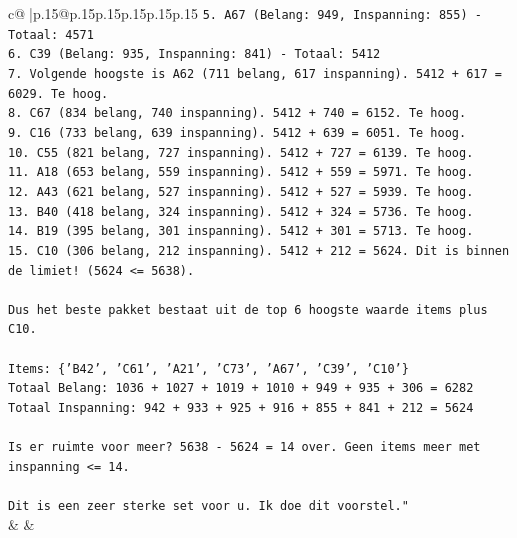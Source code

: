 \documentclass{article}
\begin{document}
{\begin{supertabular}{c@{$\;$}|p{.15\linewidth}@{}p{.15\linewidth}p{.15\linewidth}p{.15\linewidth}p{.15\linewidth}p{.15\linewidth}}
{{{\texttt{5. A67 (Belang: 949, Inspanning: 855) {-} Totaal: 4571} \\
\texttt{6. C39 (Belang: 935, Inspanning: 841) {-} Totaal: 5412} \\
\texttt{7. Volgende hoogste is A62 (711 belang, 617 inspanning). 5412 + 617 = 6029. Te hoog.} \\
\texttt{8. C67 (834 belang, 740 inspanning). 5412 + 740 = 6152. Te hoog.} \\
\texttt{9. C16 (733 belang, 639 inspanning). 5412 + 639 = 6051. Te hoog.} \\
\texttt{10. C55 (821 belang, 727 inspanning). 5412 + 727 = 6139. Te hoog.} \\
\texttt{11. A18 (653 belang, 559 inspanning). 5412 + 559 = 5971. Te hoog.} \\
\texttt{12. A43 (621 belang, 527 inspanning). 5412 + 527 = 5939. Te hoog.} \\
\texttt{13. B40 (418 belang, 324 inspanning). 5412 + 324 = 5736. Te hoog.} \\
\texttt{14. B19 (395 belang, 301 inspanning). 5412 + 301 = 5713. Te hoog.} \\
\texttt{15. C10 (306 belang, 212 inspanning). 5412 + 212 = 5624. Dit is binnen de limiet! (5624 <= 5638).} \\
\\ 
\texttt{Dus het beste pakket bestaat uit de top 6 hoogste waarde items plus C10.} \\
\\ 
\texttt{Items: \{'B42', 'C61', 'A21', 'C73', 'A67', 'C39', 'C10'\}} \\
\texttt{Totaal Belang: 1036 + 1027 + 1019 + 1010 + 949 + 935 + 306 = 6282} \\
\texttt{Totaal Inspanning: 942 + 933 + 925 + 916 + 855 + 841 + 212 = 5624} \\
\\ 
\texttt{Is er ruimte voor meer? 5638 {-} 5624 = 14 over. Geen items meer met inspanning <= 14.} \\
\\ 
\texttt{Dit is een zeer sterke set voor u. Ik doe dit voorstel."} \\
            }
        }
    }
    & & \\ \\


\end{supertabular}}
\end{document}

